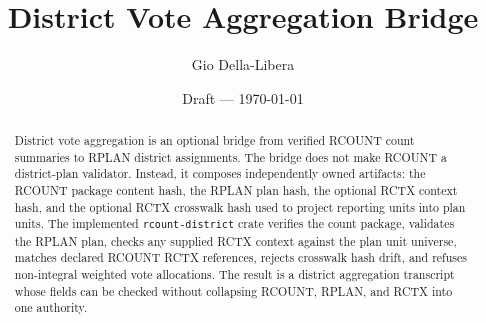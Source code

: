 \documentclass[12pt]{article}
\title{District Vote Aggregation Bridge}
\author{Gio Della-Libera}
\date{Draft --- \today}
\begin{document}
\maketitle

\begin{abstract}
District vote aggregation is an optional bridge from verified RCOUNT count
summaries to RPLAN district assignments. The bridge does not make RCOUNT a
district-plan validator. Instead, it composes independently owned artifacts:
the RCOUNT package content hash, the RPLAN plan hash, the optional RCTX context
hash, and the optional RCTX crosswalk hash used to project reporting units into
plan units. The implemented \texttt{rcount-district} crate verifies the count
package, validates the RPLAN plan, checks any supplied RCTX context against the
plan unit universe, matches declared RCOUNT RCTX references, rejects crosswalk
hash drift, and refuses non-integral weighted vote allocations. The result is a
district aggregation transcript whose fields can be checked without collapsing
RCOUNT, RPLAN, and RCTX into one authority.
\end{abstract}








\nocite{rcount-overview-2026,rplan-substrate-2026}


\end{document}

